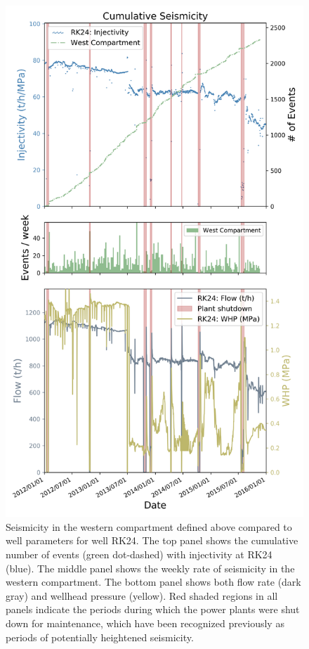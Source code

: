 \begin{figure}[h!]
\begin{center}
\includegraphics[width=0.56\columnwidth]{Chapter_4_Rot/figures/Rot_dets_GC_two_panel_WHP-flow_west_compartment_RK24/Rot_dets_GC_three_panel_II-rate-WHP_west_compartment_RK24_original}
\caption{{Seismicity in the western compartment defined above compared to well
parameters for well RK24. The top panel shows the cumulative number of
events (green dot-dashed) with injectivity at RK24 (blue). The middle
panel shows the weekly rate of seismicity in the western compartment.
The bottom panel shows both flow rate (dark gray) and wellhead pressure
(yellow). Red shaded regions in all panels indicate the periods during
which the power plants were shut down for maintenance, which have been
recognized previously as periods of potentially heightened seismicity.
{\label{108171}}%
}}
\end{center}
\end{figure}

